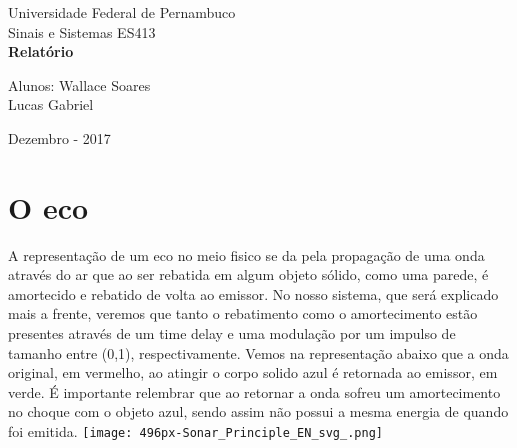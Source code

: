 \documentclass[a4paper, 12pt]{article}
\begin{document}
\begin{titlepage}
	\begin{center}
	

		\Huge{Universidade Federal de Pernambuco}\\
		\large{Sinais e Sistemas ES413}\\ 
		\vspace{15pt}
        \vspace{95pt}
        \textbf{\LARGE{Relatório}}\\
		\vspace{3,5cm}
	\end{center}
	
	\begin{flushleft}
		\begin{tabbing}
			Alunos: Wallace Soares\\
       Lucas Gabriel\\ 
	\end{tabbing}
 \end{flushleft}
	\vspace{1cm}
	
	\begin{center}
		\vspace{\fill}
			 Dezembro - 2017\\
		
			\end{center}
\end{titlepage}

\newpage
\tableofcontents
\thispagestyle{empty}

\newpage
{}
\section{O eco}
A representação de um eco no meio fisico se da pela propagação de uma onda através do ar que ao ser rebatida em algum objeto sólido, como uma parede, é amortecido e rebatido de volta ao emissor. No nosso sistema, que será explicado mais a frente, veremos que tanto o rebatimento como o amortecimento estão presentes através de um time delay e uma modulação por um impulso de tamanho entre (0,1), respectivamente. Vemos na representação abaixo que a onda original, em vermelho, ao atingir o corpo solido azul é retornada ao emissor, em verde. É importante relembrar que ao retornar a onda sofreu um amortecimento no choque com o objeto azul, sendo assim não possui a mesma energia de quando foi emitida.
\newline
\texttt{[image: 496px-Sonar\_Principle\_EN\_svg\_.png]}
\end{document}
